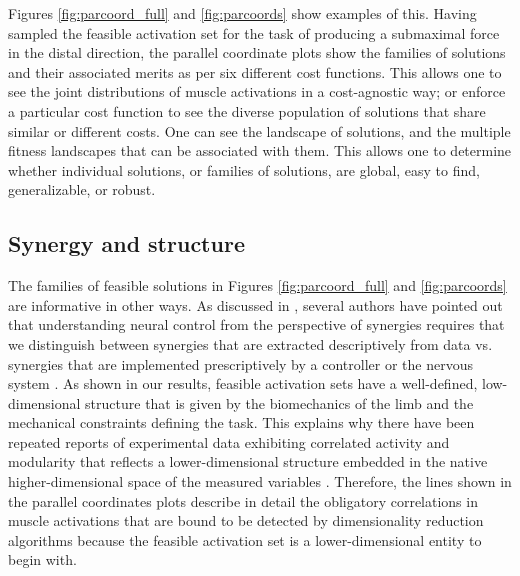 Figures \ref{fig:parcoord_full} and \ref{fig:parcoords} show examples of this. Having sampled the feasible activation set for the task of producing a submaximal force in the distal direction, the parallel coordinate plots show the families of solutions and their associated merits as per six different cost functions.  This allows one to see the joint distributions of muscle activations in  a cost-agnostic way; or enforce a particular cost function to see the diverse population of solutions that share similar or different costs. One can see  the landscape of solutions, and the multiple fitness landscapes that can be associated with them. This allows one to determine whether individual solutions, or families of solutions, are global, easy to find, generalizable, or robust.

\subsection*{Synergy and structure}

The families of feasible solutions in Figures \ref{fig:parcoord_full} and \ref{fig:parcoords} are informative in other ways. As discussed  in  \cite{valero-cuevas2015fundamentals}, several authors have pointed out that  understanding neural control from the perspective of synergies requires that we  distinguish between synergies that are extracted descriptively from data vs. synergies that are implemented prescriptively by a controller or the nervous system \cite{alessandro2013musclesynergies,kutch2012challenges,tresch2009case,scholz1999uncontrolled}. As shown in our results, feasible activation sets have a well-defined, low-dimensional structure that is given by the biomechanics of the limb and the mechanical constraints defining the task. This explains why there have been repeated reports of experimental data exhibiting correlated activity and modularity that reflects a lower-dimensional structure embedded in the native higher-dimensional space of the  measured variables \cite{Frontiers2012Modularity}. Therefore, the lines shown in the parallel coordinates plots describe in detail the obligatory correlations in muscle activations that are bound to be detected by dimensionality reduction algorithms because the feasible activation set is a lower-dimensional entity to begin with.

